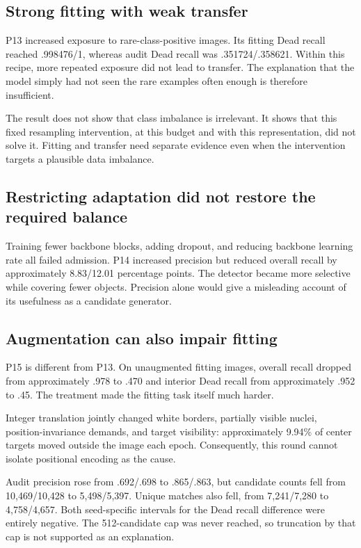 \documentclass[11pt,a4paper]{article}
\begin{document}
\subsection{Strong fitting with weak transfer}

P13 increased exposure to rare-class-positive images. Its fitting Dead recall reached .998476/1, whereas audit Dead recall was .351724/.358621. Within this recipe, more repeated exposure did not lead to transfer. The explanation that the model simply had not seen the rare examples often enough is therefore insufficient.

The result does not show that class imbalance is irrelevant. It shows that this fixed resampling intervention, at this budget and with this representation, did not solve it. Fitting and transfer need separate evidence even when the intervention targets a plausible data imbalance.

\subsection{Restricting adaptation did not restore the required balance}

Training fewer backbone blocks, adding dropout, and reducing backbone learning rate all failed admission. P14 increased precision but reduced overall recall by approximately 8.83/12.01 percentage points. The detector became more selective while covering fewer objects. Precision alone would give a misleading account of its usefulness as a candidate generator.

\subsection{Augmentation can also impair fitting}

P15 is different from P13. On unaugmented fitting images, overall recall dropped from approximately .978 to .470 and interior Dead recall from approximately .952 to .45. The treatment made the fitting task itself much harder.

Integer translation jointly changed white borders, partially visible nuclei, position-invariance demands, and target visibility: approximately 9.94\% of center targets moved outside the image each epoch. Consequently, this round cannot isolate positional encoding as the cause.

Audit precision rose from .692/.698 to .865/.863, but candidate counts fell from 10,469/10,428 to 5,498/5,397. Unique matches also fell, from 7,241/7,280 to 4,758/4,657. Both seed-specific intervals for the Dead recall difference were entirely negative. The 512-candidate cap was never reached, so truncation by that cap is not supported as an explanation.
\end{document}
